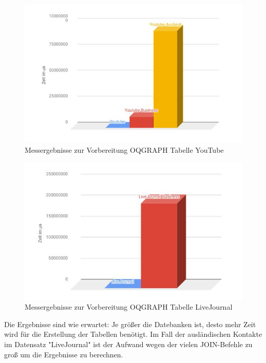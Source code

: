 \begin{figure}
	\centering
	\includegraphics[width=\textwidth]{images/youtubvor.jpg}
	\caption{Messergebnisse zur Vorbereitung OQGRAPH Tabelle YouTube}
	\label{fig:youtubvor}
\end{figure}

\begin{figure}
	\centering
	\includegraphics[width=\textwidth]{images/LiJouvor.jpg}
	\caption{Messergebnisse zur Vorbereitung OQGRAPH Tabelle LiveJournal}
	\label{fig:LiJouvor}
\end{figure}

Die Ergebnisse sind wie erwartet: Je größer die Datebanken ist, desto mehr Zeit wird für die Erstellung der Tabellen benötigt. Im Fall der ausländischen Kontakte im Datensatz "LiveJournal" ist der Aufwand wegen der vielen JOIN-Befehle zu groß um die Ergebnisse zu berechnen.

